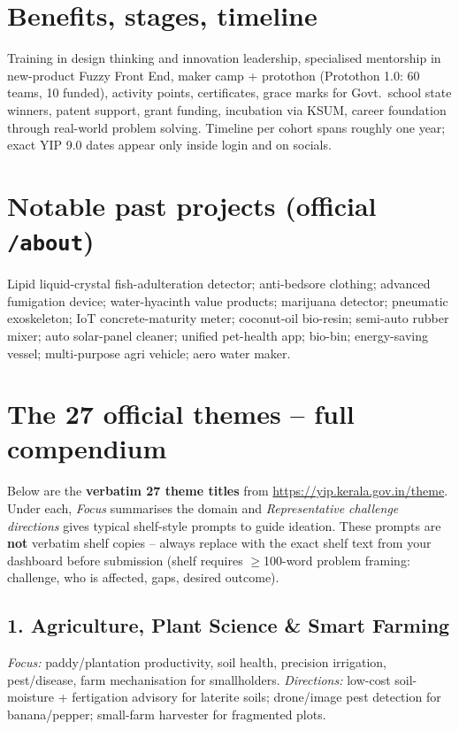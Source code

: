 \documentclass[11pt,a4paper]{article}
\begin{document}
\section{Benefits, stages, timeline}
Training in design thinking and innovation leadership, specialised mentorship in new-product Fuzzy Front End, maker camp + protothon (Protothon 1.0: 60 teams, 10 funded), activity points, certificates, grace marks for Govt.\ school state winners, patent support, grant funding, incubation via KSUM, career foundation through real-world problem solving. Timeline per cohort spans roughly one year; exact YIP 9.0 dates appear only inside login and on socials.

\section{Notable past projects (official \texttt{/about})}
Lipid liquid-crystal fish-adulteration detector; anti-bedsore clothing; advanced fumigation device; water-hyacinth value products; marijuana detector; pneumatic exoskeleton; IoT concrete-maturity meter; coconut-oil bio-resin; semi-auto rubber mixer; auto solar-panel cleaner; unified pet-health app; bio-bin; energy-saving vessel; multi-purpose agri vehicle; aero water maker.

\section{The 27 official themes -- full compendium}

Below are the \textbf{verbatim 27 theme titles} from \url{https://yip.kerala.gov.in/theme}. Under each, \textit{Focus} summarises the domain and \textit{Representative challenge directions} gives typical shelf-style prompts to guide ideation. These prompts are \textbf{not} verbatim shelf copies -- always replace with the exact shelf text from your dashboard before submission (shelf requires $\geq$100-word problem framing: challenge, who is affected, gaps, desired outcome).

\subsection{1. Agriculture, Plant Science \& Smart Farming}
\textit{Focus:} paddy/plantation productivity, soil health, precision irrigation, pest/disease, farm mechanisation for smallholders. \textit{Directions:} low-cost soil-moisture + fertigation advisory for laterite soils; drone/image pest detection for banana/pepper; small-farm harvester for fragmented plots.
\end{document}
